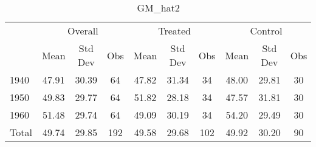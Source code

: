 \begin{table}[htbp]\centering
\def\sym#1{\ifmmode^{#1}\else\(^{#1}\)\fi}
\caption{GM\_hat2 \label{tab1}}
\begin{tabular}{l*{3}{ccc}}
\toprule
                    &\multicolumn{3}{c}{Overall}           &\multicolumn{3}{c}{Treated}           &\multicolumn{3}{c}{Control}           \\
                    &        Mean&     Std Dev&         Obs&        Mean&     Std Dev&         Obs&        Mean&     Std Dev&         Obs\\
\midrule
1940                &       47.91&       30.39&          64&       47.82&       31.34&          34&       48.00&       29.81&          30\\
1950                &       49.83&       29.77&          64&       51.82&       28.18&          34&       47.57&       31.81&          30\\
1960                &       51.48&       29.74&          64&       49.09&       30.19&          34&       54.20&       29.49&          30\\
Total               &       49.74&       29.85&         192&       49.58&       29.68&         102&       49.92&       30.20&          90\\
\bottomrule
\end{tabular}
\end{table}

